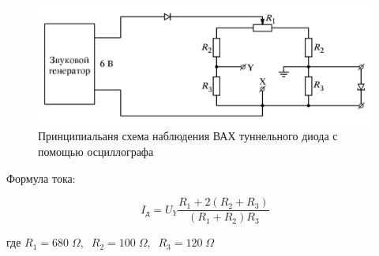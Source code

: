 \documentclass[a4paper]{article}
\begin{document}
\begin{figure}[H]
    \begin{center}
        \includegraphics[scale = 0.8]{osc.png}
        \caption{Принципиальаня схема наблюдения ВАХ туннельного диода с помощью осциллографа}
        \label{osc}
    \end{center}
\end{figure}

Формула тока:

\begin{equation}
    I_д = U_Y \frac{R_1 + 2(R_2 + R_3)}{(R_1 + R_2)R_3}
    \label{cur}
\end{equation}

где $R_1 = 680 \; \Omega, \;\; R_2 = 100 \; \Omega, \;\; R_3 = 120 \; \Omega$
\end{document}

